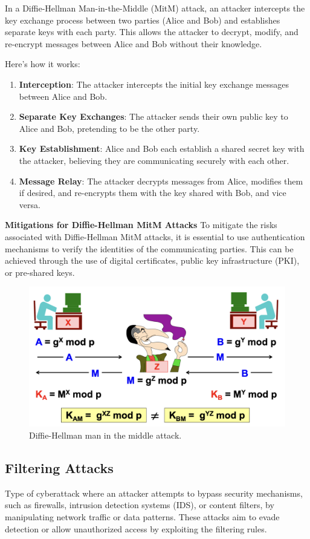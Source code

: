 In a Diffie-Hellman Man-in-the-Middle (MitM) attack, an attacker intercepts the key exchange process between two parties (Alice and Bob) and establishes separate keys with each party. This allows the attacker to decrypt, modify, and re-encrypt messages between Alice and Bob without their knowledge.

Here's how it works:
\begin{enumerate}
    \item \textbf{Interception}: The attacker intercepts the initial key exchange messages between Alice and Bob.
    \item \textbf{Separate Key Exchanges}: The attacker sends their own public key to Alice and Bob, pretending to be the other party.
    \item \textbf{Key Establishment}: Alice and Bob each establish a shared secret key with the attacker, believing they are communicating securely with each other.
    \item \textbf{Message Relay}: The attacker decrypts messages from Alice, modifies them if desired, and re-encrypts them with the key shared with Bob, and vice versa.
\end{enumerate}

\textbf{Mitigations for Diffie-Hellman MitM Attacks}
To mitigate the risks associated with Diffie-Hellman MitM attacks, it is essential to use authentication mechanisms to verify the identities of the communicating parties. This can be achieved through the use of digital certificates, public key infrastructure (PKI), or pre-shared keys. 


\begin{figure}[H]
    \centering
    \includegraphics[width=0.8\linewidth]{Images/Cryptography/dh_mitm.png}
    \caption{Diffie-Hellman man in the middle attack.}
\end{figure}

\begin{center}
    \section{Filtering Attacks}
\end{center}
Type of cyberattack where an attacker attempts to bypass security mechanisms, such as firewalls, intrusion detection systems (IDS), or content filters, by manipulating network traffic or data patterns. These attacks aim to evade detection or allow unauthorized access by exploiting the filtering rules.



